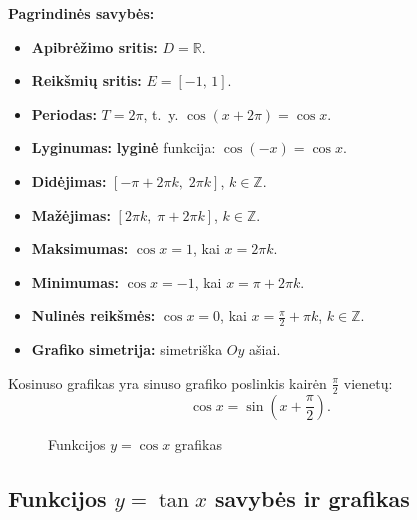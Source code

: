 \textbf{Pagrindinės savybės:}
\begin{itemize}
    \item \textbf{Apibrėžimo sritis:} \(D = \mathbb{R}\).
    \item \textbf{Reikšmių sritis:} \(E = [-1,\, 1]\).
    \item \textbf{Periodas:} \(T = 2\pi\), t.~y. \(\cos(x + 2\pi) = \cos x\).
    \item \textbf{Lyginumas:} \textbf{lyginė} funkcija: \(\cos(-x) = \cos x\).
    \item \textbf{Didėjimas:} \([-\pi + 2\pi k,\; 2\pi k]\), \(k \in \mathbb{Z}\).
    \item \textbf{Mažėjimas:} \([2\pi k,\; \pi + 2\pi k]\), \(k \in \mathbb{Z}\).
    \item \textbf{Maksimumas:} \(\cos x = 1\), kai \(x = 2\pi k\).
    \item \textbf{Minimumas:} \(\cos x = -1\), kai \(x = \pi + 2\pi k\).
    \item \textbf{Nulinės reikšmės:} \(\cos x = 0\), kai \(x = \frac{\pi}{2} + \pi k\), \(k \in \mathbb{Z}\).
    \item \textbf{Grafiko simetrija:} simetriška \(Oy\) ašiai.
\end{itemize}

\begin{remark}
Kosinuso grafikas yra sinuso grafiko poslinkis kairėn \(\frac{\pi}{2}\) vienetų:
\[
\cos x = \sin\!\left(x + \frac{\pi}{2}\right).
\]
\end{remark}

\begin{figure}[h!]
\centering
{}
\caption{Funkcijos \(y = \cos x\) grafikas}
\end{figure}

\subsection{Funkcijos \texorpdfstring{\(y = \tan x\)}{y = tan x} savybės ir grafikas}

